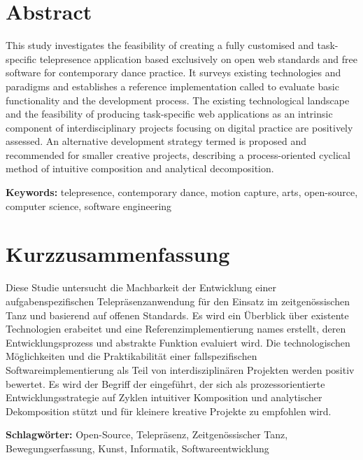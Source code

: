 \section*{Abstract}

This study investigates the feasibility of creating a fully customised and task-specific telepresence application based exclusively on open web standards and free software for contemporary dance practice.
It surveys existing technologies and paradigms and establishes a reference implementation called  to evaluate basic functionality and the development process.
The existing technological landscape and the feasibility of producing task-specific web applications as an intrinsic component of interdisciplinary projects focusing on digital practice are positively assessed.
An alternative development strategy termed  is proposed and recommended for smaller creative projects, describing a process-oriented cyclical method of intuitive composition and analytical decomposition.

\textbf{Keywords:} telepresence, contemporary dance, motion capture, arts, open-source, computer science, software engineering


\section*{Kurzzusammenfassung}

Diese Studie untersucht die Machbarkeit der Entwicklung einer aufgabenspezifischen Telepräsenzanwendung für den Einsatz im zeitgenössischen Tanz und basierend auf offenen Standards.
Es wird ein Überblick über existente Technologien erabeitet und eine Referenzimplementierung names  erstellt, deren Entwicklungsprozess und abstrakte Funktion evaluiert wird.
Die technologischen Möglichkeiten und die Praktikabilität einer fallspezifischen Softwareimplementierung als Teil von interdisziplinären Projekten werden positiv bewertet.
Es wird der Begriff der  eingeführt, der sich als prozessorientierte Entwicklungsstrategie auf Zyklen intuitiver Komposition und analytischer Dekomposition stützt und für kleinere kreative Projekte zu empfohlen wird.
 
 \textbf{Schlagwörter:} Open-Source, Telepräsenz, Zeitgenössischer Tanz, Bewegungserfassung, Kunst, Informatik, Softwareentwicklung
 